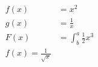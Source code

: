 \documentclass{article}
\begin{document}
\begin{align*}
f(x) &= x^2\\
g(x) &= \frac{1}{x}\\
F(x) &= \int^a_b \frac{1}{2}x^3 \\
f(x) = \frac{1}{\sqrt{x}}
\end{align*}
\end{document}
